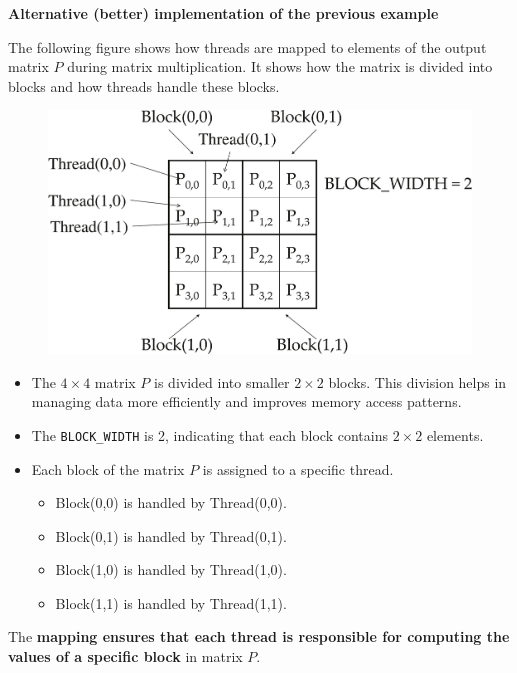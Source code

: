\begin{flushleft}
    \textcolor{Green3}{ \textbf{Alternative (better) implementation of the previous example}}
\end{flushleft}
The following figure shows how threads are mapped to elements of the output matrix $P$ during matrix multiplication. It shows how the matrix is divided into blocks and how threads handle these blocks.
\begin{figure}[!htp]
    \centering
    \includegraphics[width=.8\textwidth]{img/cuda-matrix-multiplication-2.pdf}
\end{figure}
\begin{itemize}
    \item The $4 \times 4$ matrix $P$ is divided into smaller $2 \times 2$ blocks. This division helps in managing data more efficiently and improves memory access patterns.
    \item The \texttt{BLOCK\_WIDTH} is 2, indicating that each block contains $2 \times 2$ elements.
    \item Each block of the matrix $P$ is assigned to a specific thread.
    \begin{itemize}
        \item Block(0,0) is handled by Thread(0,0).
        \item Block(0,1) is handled by Thread(0,1).
        \item Block(1,0) is handled by Thread(1,0).
        \item Block(1,1) is handled by Thread(1,1).
    \end{itemize}
\end{itemize}
The \textbf{mapping ensures that each thread is responsible for computing the values of a specific block} in matrix $P$.

